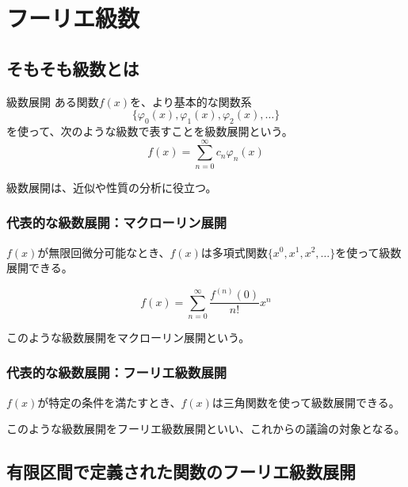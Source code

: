 \documentclass[../imaging-math]{subfiles}
\begin{document}
\section{フーリエ級数}

\subsection{そもそも級数とは}

\begin{definition}{級数展開}
  \titlegap
  ある関数$f(x)$を、より基本的な関数系
  \Large
  \begin{equation}
    \{\varphi_0(x), \varphi_1(x), \varphi_2(x), \dots\}
  \end{equation}
  \normalsize
  を使って、次のような級数で表すことを級数展開という。
  \LARGE
  \begin{equation}
    f(x) = \sum_{n=0}^{\infty} c_n \varphi_n(x)
  \end{equation}
\end{definition}

級数展開は、近似や性質の分析に役立つ。

\subsubsection{代表的な級数展開：マクローリン展開}

$f(x)$が無限回微分可能なとき、$f(x)$は多項式関数$\{x^0, x^1, x^2, \dots\}$を使って級数展開できる。

\begin{equation}
  f(x) = \sum_{n=0}^{\infty} \dfrac{f^{(n)}(0)}{n!}x^n
\end{equation}

このような級数展開をマクローリン展開という。

\subsubsection{代表的な級数展開：フーリエ級数展開}

$f(x)$が特定の条件を満たすとき、$f(x)$は三角関数を使って級数展開できる。

このような級数展開をフーリエ級数展開といい、これからの議論の対象となる。

\subsection{有限区間で定義された関数のフーリエ級数展開}
\end{document}
